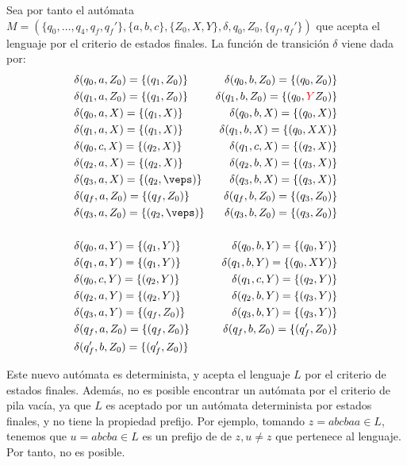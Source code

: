 \begin{ejercicio}
    Sea por tanto el autómata $M = (\{q_0,\dots,q_4,q_f,q_f'\},\{a,b,c\},\{Z_0,X,Y\},\delta,q_0,Z_0,\{q_f,q_f'\})$ que acepta el lenguaje por el criterio de estados finales. La función de transición $\delta$ viene dada por:
    \begin{align*}
        &\delta(q_0,a,Z_0) = \{(q_1,Z_0)\}
        &\delta(q_0,b,Z_0) = \{(q_0,Z_0)\} \\
        &\delta(q_1,a,Z_0) = \{(q_1,Z_0)\} 
        &\delta(q_1,b,Z_0) = \{(q_0,\red{Y}Z_0)\} \\
        &\delta(q_0,a,X) = \{(q_1,X)\} 
        &\delta(q_0,b,X) = \{(q_0,X)\} \\
        &\delta(q_1,a,X) = \{(q_1,X)\} 
        &\delta(q_1,b,X) = \{(q_0,XX)\} \\
        &\delta(q_0,c,X) = \{(q_2,X)\} 
        &\delta(q_1,c,X) = \{(q_2,X)\} \\
        &\delta(q_2,a,X) = \{(q_2,X)\} 
        &\delta(q_2,b,X) = \{(q_3,X)\} \\
        &\delta(q_3,a,X) = \{(q_2,\veps)\} 
        &\delta(q_3,b,X) = \{(q_3,X)\} \\
        &\delta(q_f,a,Z_0) = \{(q_f,Z_0)\} 
        &\delta(q_f,b,Z_0) = \{(q_3,Z_0)\} \\
        &\delta(q_3,a,Z_0) = \{(q_2,\veps)\}
        &\delta(q_3,b,Z_0) = \{(q_3,Z_0)\}\\ \\
        &\delta(q_0,a,Y) = \{(q_1,Y)\} 
        &\delta(q_0,b,Y) = \{(q_0,Y)\} \\
        &\delta(q_1,a,Y) = \{(q_1,Y)\} 
        &\delta(q_1,b,Y) = \{(q_0,XY)\} \\
        &\delta(q_0,c,Y) = \{(q_2,Y)\} 
        &\delta(q_1,c,Y) = \{(q_2,Y)\} \\
        &\delta(q_2,a,Y) = \{(q_2,Y)\} 
        &\delta(q_2,b,Y) = \{(q_3,Y)\} \\
        &\delta(q_3,a,Y) = \{(q_f,Z_0)\} 
        &\delta(q_3,b,Y) = \{(q_3,Y)\} \\
        &\delta(q_f,a,Z_0) = \{(q_f,Z_0)\} 
        &\delta(q_f,b,Z_0) = \{(q_f',Z_0)\} \\
        &\delta(q_f',b,Z_0) = \{(q_f',Z_0)\}
    \end{align*}

    Este nuevo autómata es determinista, y acepta el lenguaje $L$ por el criterio de estados finales.
    Además, no es posible encontrar un autómata por el criterio de pila vacía, ya que $L$ es aceptado por un autómata determinista por estados finales, y no tiene la propiedad prefijo. Por ejemplo, tomando $z=abcbaa\in L$, tenemos que $u=abcba\in L$ es un prefijo de de $z,u\neq z$ que pertenece al lenguaje. Por tanto, no es posible. 
\end{ejercicio}

